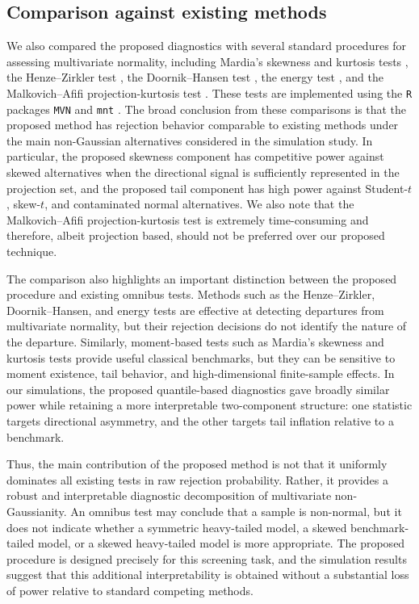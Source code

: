 \documentclass[11pt]{article}
\theoremstyle{plain}
\theoremstyle{definition}
\theoremstyle{remark}
\begin{document}
\subsection{Comparison against existing methods}

We also compared the proposed diagnostics with several standard procedures for assessing multivariate normality, including Mardia's skewness and kurtosis tests \citep{mardia1970measures}, the Henze--Zirkler test \citep{henze1990class}, the Doornik--Hansen test \citep{doornik2008omnibus}, the energy test \citep{szekely2013energy}, and the Malkovich--Afifi projection-kurtosis test \citep{malkovich1973tests}. These tests are implemented using the \texttt{R} packages \texttt{MVN} \citep{MVNpackage} and \texttt{mnt} \citep{mntpackage}. The broad conclusion from these comparisons is that the proposed method has rejection behavior comparable to existing methods under the main non-Gaussian alternatives considered in the simulation study.  In particular, the proposed skewness component has competitive power against skewed alternatives when the directional signal is sufficiently represented in the projection set, and the proposed tail component has high power against Student-\(t\), skew-\(t\), and contaminated normal alternatives. We also note that the Malkovich--Afifi projection-kurtosis test is extremely time-consuming and therefore, albeit projection based, should not be preferred over our proposed technique.

The comparison also highlights an important distinction between the proposed procedure and existing omnibus tests.  Methods such as the Henze--Zirkler, Doornik--Hansen, and energy tests are effective at detecting departures from multivariate normality, but their rejection decisions do not identify the nature of the departure.  Similarly, moment-based tests such as Mardia's skewness and kurtosis tests provide useful classical benchmarks, but they can be sensitive to moment existence, tail behavior, and high-dimensional finite-sample effects.  In our simulations, the proposed quantile-based diagnostics gave broadly similar power while retaining a more interpretable two-component structure: one statistic targets directional asymmetry, and the other targets tail inflation relative to a benchmark.

Thus, the main contribution of the proposed method is not that it uniformly dominates all existing tests in raw rejection probability.  Rather, it provides a robust and interpretable diagnostic decomposition of multivariate non-Gaussianity.  An omnibus test may conclude that a sample is non-normal, but it does not indicate whether a symmetric heavy-tailed model, a skewed benchmark-tailed model, or a skewed heavy-tailed model is more appropriate.  The proposed procedure is designed precisely for this screening task, and the simulation results suggest that this additional interpretability is obtained without a substantial loss of power relative to standard competing methods.
\end{document}
